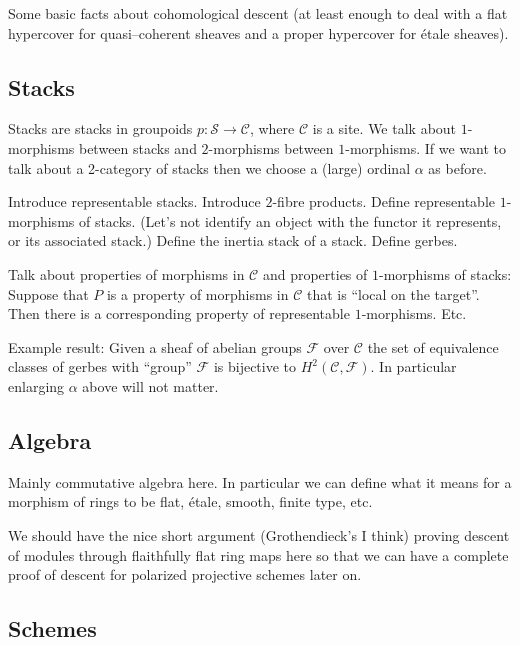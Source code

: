 \documentclass{amsart}
\theoremstyle{definition}
\theoremstyle{remark}
\numberwithin{equation}{subsection}
\begin{document}
\smallskip\noindent
Some basic facts about cohomological descent (at least enough to deal
with a flat hypercover for quasi--coherent sheaves and a proper
hypercover for \'etale sheaves).

\subsection{Stacks}
\label{stacks}

\noindent
Stacks are stacks in groupoids $p : \mathcal{S} \to \mathcal{C}$, where 
$\mathcal{C}$ is a site. We talk about $1$-morphisms between stacks and 
$2$-morphisms between $1$-morphisms. If we want to talk about a 
2-category of stacks then we choose a (large) ordinal $\alpha$ as before.

\smallskip\noindent
Introduce representable stacks. Introduce $2$-fibre products. Define 
representable $1$-morphisms of stacks. (Let's not identify an object 
with the functor it represents, or its associated stack.) Define the
inertia stack of a stack. Define gerbes.

\smallskip\noindent
Talk about properties of morphisms in $\mathcal{C}$ and properties of
$1$-morphisms of stacks: Suppose that $P$ is a property of morphisms
in $\mathcal{C}$ that is ``local on the target''. Then there is a 
corresponding property of representable $1$-morphisms. Etc.

\smallskip\noindent
Example result: Given a sheaf of abelian groups $\mathcal{F}$ 
over $\mathcal{C}$ the set of equivalence classes of gerbes with ``group'' 
$\mathcal{F}$ is bijective to $H^2(\mathcal{C}, \mathcal{F})$.
In particular enlarging $\alpha$ above will not matter.

\subsection{Algebra}
\label{subsection-algebra}

\noindent
Mainly commutative algebra here. In particular we can define what it means
for a morphism of rings to be flat, \'etale, smooth, finite type, etc.

\smallskip\noindent
We should have the nice short argument (Grothendieck's I think) proving 
descent of modules through flaithfully flat ring maps here so that we can 
have a complete proof of descent for polarized projective schemes later on.

\subsection{Schemes}
\label{subsection-schemes}
\end{document}
